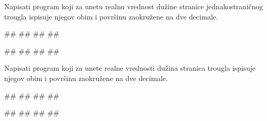 \begin{Exercise}[label=p1.1_03a] 
Napisati program koji za unetu realnu vrednost dužine stranice jednakostraničnog trougla ispisuje njegov obim i površinu zaokružene na dve decimale. 

\begin{miditest}
\begin{upotreba}{1}
#\naslovInt#
##
##
##
\end{upotreba}
\end{miditest}
\begin{miditest}
\begin{upotreba}{2}
#\naslovInt#
##
##
##
\end{upotreba}
\end{miditest}
\end{Exercise}
\begin{Answer}[ref=p1.1_03a]
\end{Answer}

\begin{Exercise}[label=p1.1_03] 
Napisati program koji za unete realne vrednosti dužina stranica trougla ispisuje njegov obim i površinu zaokružene na dve decimale. 

\begin{miditest}
\begin{upotreba}{1}
#\naslovInt#
##
##
##
\end{upotreba}
\end{miditest}
\begin{miditest}
\begin{upotreba}{2}
#\naslovInt#
##
##
##
\end{upotreba}
\end{miditest}
\end{Exercise}
\begin{Answer}[ref=p1.1_03]
\end{Answer}


